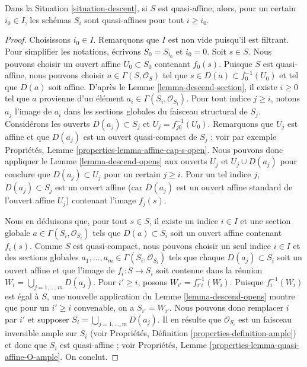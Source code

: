 \begin{lemma}
\label{lemma-limit-quasi-affine}
Dans la Situation \ref{situation-descent}, si $S$ est quasi-affine, alors,
pour un certain $i_0 \in I$, les schémas $S_i$ sont quasi-affines pour tout
$i \geq i_0$.
\end{lemma}

\begin{proof}
Choisissons $i_0 \in I$. Remarquons que $I$ est non vide puisqu'il est
filtrant. Pour simplifier les notations, écrivons $S_0 = S_{i_0}$ et
$i_0 = 0$. Soit $s \in S$. Nous pouvons choisir un ouvert affine
$U_0 \subset S_0$ contenant $f_0(s)$. Puisque $S$ est quasi-affine, nous
pouvons choisir $a \in \Gamma(S, \mathcal{O}_S)$ tel que
$s \in D(a) \subset f_0^{-1}(U_0)$ et tel que $D(a)$ soit affine. D'après le
Lemme \ref{lemma-descend-section}, il existe $i \geq 0$ tel que $a$ provienne
d'un élément $a_i \in \Gamma(S_i, \mathcal{O}_{S_i})$. Pour tout indice
$j \geq i$, notons $a_j$ l'image de $a_i$ dans les sections globales du
faisceau structural de $S_j$. Considérons les ouverts $D(a_j) \subset S_j$
et $U_j = f_{j0}^{-1}(U_0)$. Remarquons que $U_j$ est affine et que
$D(a_j)$ est un ouvert quasi-compact de $S_j$ ; voir par exemple Propriétés,
Lemme \ref{properties-lemma-affine-cap-s-open}. Nous pouvons donc appliquer
le Lemme \ref{lemma-descend-opens} aux ouverts $U_j$ et
$U_j \cup D(a_j)$ pour conclure que $D(a_j) \subset U_j$ pour un certain
$j \geq i$. Pour un tel indice $j$, $D(a_j) \subset S_j$ est un ouvert
affine (car $D(a_j)$ est un ouvert affine standard de l'ouvert affine $U_j$)
contenant l'image $f_j(s)$.

\medskip\noindent
Nous en déduisons que, pour tout $s \in S$, il existe un indice $i \in I$
et une section globale $a \in \Gamma(S_i, \mathcal{O}_{S_i})$ tels que
$D(a) \subset S_i$ soit un ouvert affine contenant $f_i(s)$. Comme $S$ est
quasi-compact, nous pouvons choisir un seul indice $i \in I$ et des sections
globales $a_1, \ldots, a_m \in \Gamma(S_i, \mathcal{O}_{S_i})$ tels que
chaque $D(a_j) \subset S_i$ soit un ouvert affine et que l'image de
$f_i : S \to S_i$ soit contenue dans la réunion
$W_i = \bigcup_{j = 1, \ldots, m} D(a_j)$. Pour $i' \geq i$, posons
$W_{i'} = f_{i'i}^{-1}(W_i)$. Puisque $f_i^{-1}(W_i)$ est égal à $S$, une nouvelle
application du Lemme \ref{lemma-descend-opens} montre que
pour un $i' \geq i$ convenable, on a $S_{i'} = W_{i'}$. Nous pouvons donc remplacer
$i$ par $i'$ et supposer
$S_i = \bigcup_{j = 1, \ldots, m} D(a_j)$. Il en résulte que
$\mathcal{O}_{S_i}$ est un faisceau inversible ample sur $S_i$ (voir
Propriétés, Définition \ref{properties-definition-ample}) et donc que $S_i$
est quasi-affine ; voir Propriétés,
Lemme \ref{properties-lemma-quasi-affine-O-ample}. On conclut.
\end{proof}

